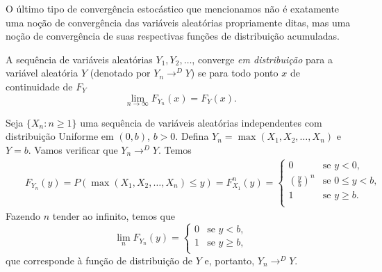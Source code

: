 \begin{frame}
%
O último tipo de convergência estocástico que mencionamos não é
exatamente uma noção de convergência das variáveis aleatórias
propriamente ditas, mas uma noção de convergência de suas
respectivas funções de distribuição acumuladas.
%
\begin{defi}
A sequência de variáveis aleatórias $Y_1,Y_2,\ldots$, converge {\em
em distribuição} para a variável aleatória $Y$ (denotado por  $Y_n\rightarrow^D Y$) se para todo ponto
$x$ de continuidade de $F_Y$
%
$$\lim_{n\rightarrow\infty}F_{Y_n}(x)=F_Y(x).$$
\end{defi}
%
%
%
%
\begin{exem}
Seja $\{X_n:n\geq 1\}$ uma sequência de variáveis aleatórias
independentes com distribuição Uniforme em $(0,b)$, $b>0$. Defina
$Y_n=\max(X_1,X_2,\ldots,X_n)$ e $Y=b$. Vamos verificar que
$Y_n\rightarrow^D Y$. Temos
%
\begin{eqnarray}
& & F_{Y_n}(y)=P(\max(X_1,X_2,\ldots,X_n)\leq y)=F_{X_1}^n(y)= \left\{
\begin{array}{ll}
0 & \mbox{se $y<0$,} \\
(\frac{y}{b})^n & \mbox{se $0\leq
y<b$,}\\
1 & \mbox{se $y\geq b$.} \\
\end{array}
\right.
\nonumber
\end{eqnarray}
%
%
%
Fazendo $n$ tender ao infinito, temos que
\[
\lim_n F_{Y_n}(y)= \left\{
\begin{array}{ll}
0 & \mbox{se $y<b$,} \\
1 & \mbox{se $y\geq b$,} \\
\end{array}
\right.
\]
que corresponde à função de distribuição de $Y$ e, portanto,
$Y_n\rightarrow^D Y$.
\end{exem}
%
\end{frame}
